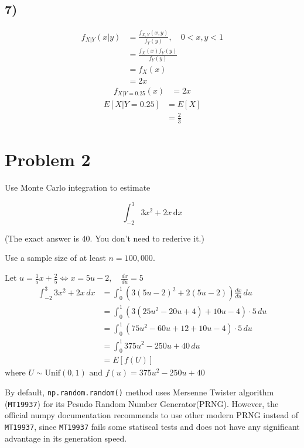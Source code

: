 \documentclass[11pt]{article}
\begin{document}
    \subsection*{7)}
    \begin{align*}
        f_{X|Y}(x|y) &= \frac{f_{X,Y}(x,y)}{f_Y(y)}, \quad 0 < x, y < 1 \\ 
        &= \frac{f_{X}(x)f_Y(y)}{f_Y(y)} \\ 
        &= f_{X}(x) \\ 
        &= 2x
    \end{align*}
    \begin{align*}
        f_{X|Y=0.25}(x) &= 2x
    \end{align*}
    \begin{align*}
        E[X|Y=0.25] &= E[X] \\ 
        &= \frac{2}{3}
    \end{align*}

\hypertarget{problem-2}{%
\section{Problem 2}\label{problem-2}}

Use Monte Carlo integration to estimate

\[\int_{-2}^{3}3x^2 + 2x\,\textrm{d}x\]

(The exact answer is 40. You don't need to rederive it.)

Use a sample size of at least \(n = 100,000\).

Let
\(u = \frac{1}{5}x + \frac{2}{5} \Leftrightarrow x = 5u - 2,\quad \frac{dx}{du} = 5\)
\begin{align*}
    \int_{-2}^{3}3x^2 + 2x\,dx &= \int_{0}^{1} (3(5u - 2)^2 + 2(5u - 2)) \frac{dx}{du} \,du  \\ 
    &= \int^{1}_{0} ( 3(25u^{2} - 20u + 4) + 10u - 4) \cdot 5\,du \\ 
    &= \int_{0}^{1}\left( 75u^{2} - 60u + 12 + 10u - 4 \right) \cdot 5\,du \\ 
    &= \int^{1}_{0} 375u^{2} - 250u + 40 \,du \\ 
    &= E[f(U)]
\end{align*}
\(\text{where } U \sim \text{Unif}(0,1)\text{ and }f(u) = 375u^{2} - 250u + 40\)

    By default, \texttt{np.random.random()} method uses Mersenne Twister
algorithm (\texttt{MT19937}) for its Pesudo Random Number
Generator(PRNG). However, the official numpy documentation recommends to
use other modern PRNG instead of \texttt{MT19937}, since
\texttt{MT19937} fails some statiscal tests and does not have any
significant advantage in its generation speed.
\end{document}
